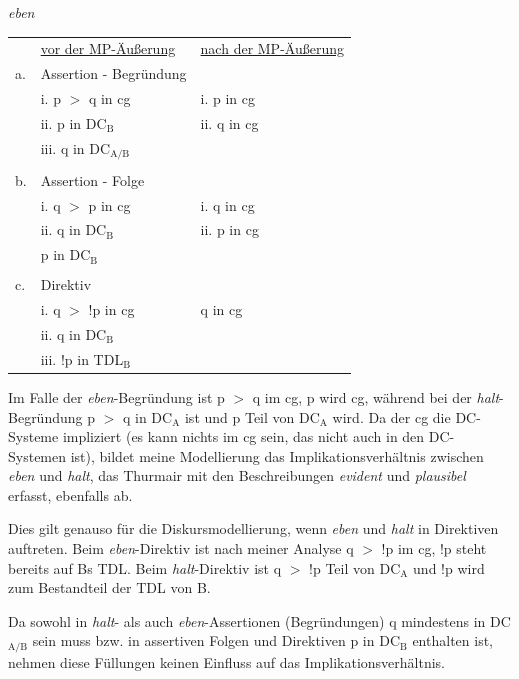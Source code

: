 \begin{exe}
        \ex\label{656} \textit{eben}\\[-0.5em]
    \begin{tabular}[t]{lll}
    & \underline{vor der MP-Äußerung} & \underline{nach der MP-Äußerung}\\
    a. & Assertion - Begründung & {}\\
    {} & i. p $>$ q in cg & i. p in cg\\
	{} & ii. p in DC$_{\textrm{B}}$ & ii. q in cg\\
	{} & iii. q in DC$_{\textrm{A/B}}$ & {}\\	
	{} & {} & {}\\
	b. & Assertion - Folge & {}\\
	{} & i. q $>$ p in cg & i. q in cg\\
	{} & ii. q in DC$_{\textrm{B}}$ & ii. p in cg\\
	{} & p in DC$_{\textrm{B}}$ & {}\\
	{} & {} & {}\\
	c. & Direktiv & {}\\
	{} & i. q $>$ !p in cg & q in cg\\
	{} & ii. q in DC$_{\textrm{B}}$ & {}\\
	{} & iii. !p in TDL$_{\textrm{B}}$\\
    \end{tabular}
\end{exe}
Im Falle der \textit{eben}-Begründung ist p $>$ q im cg, p wird cg, während bei der \textit{halt}-Begründung p $>$ q in DC$_{\textrm{A}}$ ist und p Teil von DC$_{\textrm{A}}$ wird. Da der cg die DC-Systeme impliziert (es kann nichts im cg sein, das nicht auch in den DC-Systemen ist), bildet meine Modellierung das Implikationsverhältnis zwischen \textit{eben} und \textit{halt}, das Thurmair mit den Beschreibungen \textit{evident} und \textit{plausibel} erfasst, ebenfalls ab. 

Dies gilt genauso für die Diskursmodellierung, wenn \textit{eben} und \textit{halt} in Direktiven auftreten. Beim \textit{eben}-Direktiv ist nach meiner Analyse q $>$ !p im cg, !p steht bereits auf Bs TDL. Beim \textit{halt}-Direktiv ist q $>$ !p Teil von DC$_{\textrm{A}}$ und !p wird zum Bestandteil der TDL von B. 

Da sowohl in \textit{halt}- als auch \textit{eben}-Assertionen (Begründungen) q mindestens in DC$_{\textrm{A/B}}$ sein muss bzw. in assertiven Folgen und Direktiven p in DC$_{\textrm{B}}$ enthalten ist, nehmen diese Füllungen keinen Einfluss auf das Implikationsverhältnis. 

